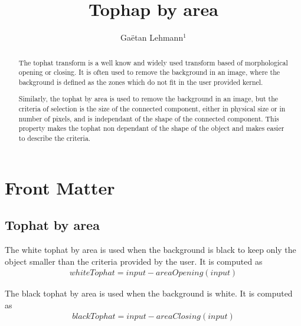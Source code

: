 \documentclass{InsightArticle}
\title{Tophap by area}
\author{Ga\"etan Lehmann{$^1$}}
\newcommand{\IJhandlerIDnumber}{}
\begin{document}
%
% 
\IJhandlefooter{\IJhandlerIDnumber}

\maketitle

\ifhtml
\chapter*{Front Matter\label{front}}
\fi


\begin{abstract}
\noindent
The tophat transform is a well know and widely used transform based of morphological opening or closing.
It is often used to remove the background in an image, where the background is defined as the zones which do not fit in the user provided kernel.

Similarly, the tophat by area is used to remove the background in an image, but the criteria of selection is the size of the connected component,
either in physical size or in number of pixels, and is independant of the shape of the connected component. This property makes the tophat non
dependant of the shape of the object and makes easier to describe the criteria.
\end{abstract}

\IJhandlenote{\IJhandlerIDnumber}

\tableofcontents

\section{Tophat by area}

The white tophat by area is used when the background is black to keep only the object smaller than the criteria provided by the user.
It is computed as
\begin{eqnarray}
whiteTophat = input - areaOpening(input)
\end{eqnarray}

The black tophat by area is used when the background is white. It is computed as
\begin{eqnarray}
blackTophat = input - areaClosing(input)
\end{eqnarray}
\end{document}
